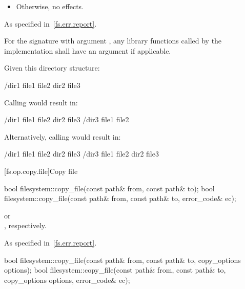 \begin{itemdescr}
\begin{itemize}
\item
Otherwise, no effects.
\end{itemize}

\pnum
\throws
As specified in~\ref{fs.err.report}.

\pnum
\remarks
For the signature with argument , any
library functions called by the implementation shall have an  argument if applicable.

\pnum
\begin{example}
Given this directory structure:
\begin{codeblock}
/dir1
  file1
  file2
  dir2
    file3
\end{codeblock}

Calling  would result in:
\begin{codeblock}
/dir1
  file1
  file2
  dir2
    file3
/dir3
  file1
  file2
\end{codeblock}

Alternatively, calling  would result in:
\begin{codeblock}
/dir1
  file1
  file2
  dir2
    file3
/dir3
  file1
  file2
  dir2
    file3
\end{codeblock}
\end{example}
\end{itemdescr}


[fs.op.copy.file]{Copy file}

%
\begin{itemdecl}
bool filesystem::copy_file(const path& from, const path& to);
bool filesystem::copy_file(const path& from, const path& to, error_code& ec);
\end{itemdecl}

\begin{itemdescr}
\pnum
\returns
{} or\\
, respectively.

\pnum
\throws
As specified in~\ref{fs.err.report}.
\end{itemdescr}

%
\begin{itemdecl}
bool filesystem::copy_file(const path& from, const path& to, copy_options options);
bool filesystem::copy_file(const path& from, const path& to, copy_options options,
               error_code& ec);
\end{itemdecl}

